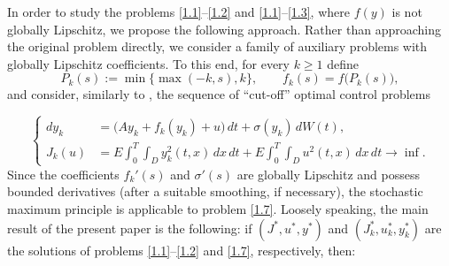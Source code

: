 \documentclass[a4paper,12pt]{article}
\numberwithin{equation}{section}
\begin{document}
In order to study the problems \eqref{1.1}--\eqref{1.2} and \eqref{1.1}--\eqref{1.3},
where $f(y)$ is not globally Lipschitz, we propose the following
approach. Rather than approaching the original problem directly, we consider a family of
auxiliary problems with globally Lipschitz coefficients. To this end, for every $k \geq 1$ define
\[
P_k(s):=\min\{\max(-k,s),k\},
\qquad
f_k(s)=f\bigl(P_k(s)\bigr),
\]
and consider, similarly to \cite{16}, the sequence of ``cut-off'' optimal control problems

\begin{equation}
\left\{
\begin{aligned}
dy_k
&=
\bigl(Ay_k+f_k(y_k)+u\bigr)\,dt
+\sigma(y_k)\,dW(t),
\\[1ex]
J_k(u)
&=
E\int_0^T\int_D y_k^2(t,x)\,dx\,dt
+
E\int_0^T\int_D u^2(t,x)\,dx\,dt
\to \inf .
\end{aligned}
\right.
\label{1.7}
\end{equation}
 Since the coefficients
$f_k'(s)$ and $\sigma'(s)$ are globally Lipschitz and  possess bounded
derivatives (after a suitable smoothing, if necessary),
 the stochastic maximum principle is applicable to
problem \eqref{1.7}. Loosely speaking, the main result of the present paper is the following: if $
(J^*,u^*,y^*)$ and $
(J_k^*,u_k^*,y_k^*)
$
are the solutions of problems
\eqref{1.1}--\eqref{1.2}
and
\eqref{1.7},
respectively, then:
\end{document}
